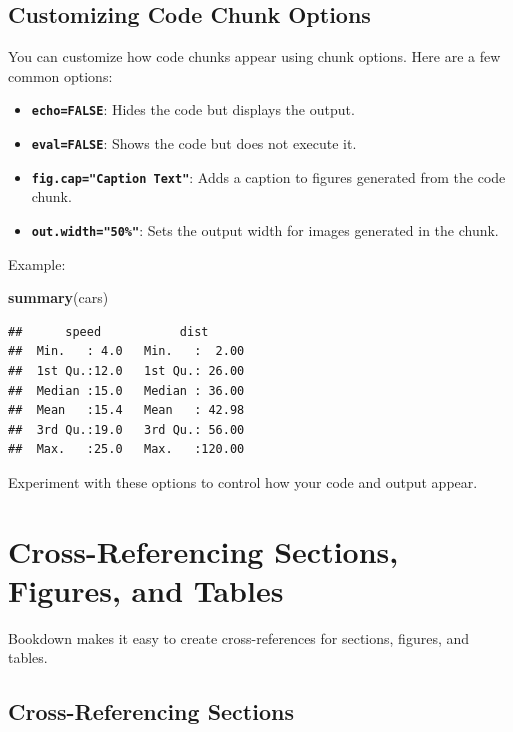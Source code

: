 \documentclass[
]{book}
\newenvironment{Shaded}{\begin{snugshade}}{\end{snugshade}}
\newcommand{\FunctionTok}[1]{\textcolor[rgb]{0.13,0.29,0.53}{\textbf{#1}}}
\newcommand{\NormalTok}[1]{#1}
\providecommand{\tightlist}{%
  \setlength{\itemsep}{0pt}\setlength{\parskip}{0pt}}
\theoremstyle{definition}
\theoremstyle{definition}
\theoremstyle{definition}
\theoremstyle{definition}
\theoremstyle{remark}
\begin{document}
\subsection{Customizing Code Chunk Options}\label{customizing-code-chunk-options}

You can customize how code chunks appear using chunk options. Here are a few common options:

\begin{itemize}
\tightlist
\item
  \textbf{\texttt{echo=FALSE}}: Hides the code but displays the output.
\item
  \textbf{\texttt{eval=FALSE}}: Shows the code but does not execute it.
\item
  \textbf{\texttt{fig.cap="Caption\ Text"}}: Adds a caption to figures generated from the code chunk.
\item
  \textbf{\texttt{out.width="50\%"}}: Sets the output width for images generated in the chunk.
\end{itemize}

Example:

\begin{Shaded}
\begin{Highlighting}[]
\FunctionTok{summary}\NormalTok{(cars)}
\end{Highlighting}
\end{Shaded}

\begin{verbatim}
##      speed           dist       
##  Min.   : 4.0   Min.   :  2.00  
##  1st Qu.:12.0   1st Qu.: 26.00  
##  Median :15.0   Median : 36.00  
##  Mean   :15.4   Mean   : 42.98  
##  3rd Qu.:19.0   3rd Qu.: 56.00  
##  Max.   :25.0   Max.   :120.00
\end{verbatim}

Experiment with these options to control how your code and output appear.

\section{Cross-Referencing Sections, Figures, and Tables}\label{cross-referencing-sections-figures-and-tables}

Bookdown makes it easy to create cross-references for sections, figures, and tables.

\subsection{Cross-Referencing Sections}\label{cross-referencing-sections}
\end{document}
